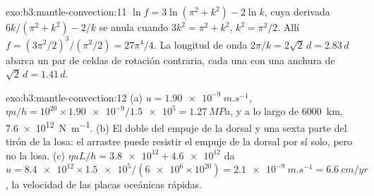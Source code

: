 \begin{solution}{exo:b3:mantle-convection:11}
$\ln f = 3\ln(\pi^2 + k^2) - 2\ln k$, cuya derivada $6k/(\pi^2 + k^2) - 2/k$
se anula cuando $3k^2 = \pi^2 + k^2$, $k^2 = \pi^2/2$. Allí $f = (3\pi^2/2)^3/
(\pi^2/2) = 27\pi^4/4$. La longitud de onda $2\pi/k = 2\sqrt2\,d = 2.83\,d$ abarca un
par de celdas de rotación contraria, cada una con una anchura de $\sqrt2\,d = 1.41\,d$.
\end{solution}

\begin{solution}{exo:b3:mantle-convection:12}
(a) $u = \qty{1.90e-9}{m.s^{-1}}$, $\eta u/h = 10^{20}\times\num{1.90e-9}/
\num{1.5e5} = \qty{1.27}{MPa}$, y a lo largo de \qty{6000}{km}, \qty{7.6e12}{N.m^{-1}}.
(b) El doble del empuje de la dorsal y una sexta parte del tirón de la losa: el arrastre puede resistir
el empuje de la dorsal por sí solo, pero no la losa. (c) $\eta uL/h = \num{3.8e12} +
\num{4.6e12}$ da $u = \num{8.4e12}\times\num{1.5e5}/(\num{6e6}\times10^{20})
= \qty{2.1e-9}{m.s^{-1}} = \qty{6.6}{cm/yr}$, la velocidad de las placas oceánicas
rápidas.
\end{solution}

